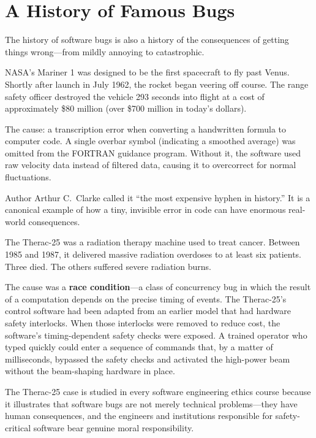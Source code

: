 \documentclass[11pt,letterpaper]{article}
\newcommand{\keyterm}[1]{\textbf{\textcolor{cssecondary}{#1}}}
\begin{document}
\section{A History of Famous Bugs}

The history of software bugs is also a history of the consequences of getting things wrong---from mildly annoying to catastrophic.

\begin{historybox}
NASA's Mariner 1 was designed to be the first spacecraft to fly past Venus. Shortly after launch in July 1962, the rocket began veering off course. The range safety officer destroyed the vehicle 293 seconds into flight at a cost of approximately \$80 million (over \$700 million in today's dollars).

The cause: a transcription error when converting a handwritten formula to computer code. A single overbar symbol (indicating a smoothed average) was omitted from the FORTRAN guidance program. Without it, the software used raw velocity data instead of filtered data, causing it to overcorrect for normal fluctuations.

Author Arthur C.\ Clarke called it ``the most expensive hyphen in history.'' It is a canonical example of how a tiny, invisible error in code can have enormous real-world consequences.
\end{historybox}

\begin{historybox}
The Therac-25 was a radiation therapy machine used to treat cancer. Between 1985 and 1987, it delivered massive radiation overdoses to at least six patients. Three died. The others suffered severe radiation burns.

The cause was a \keyterm{race condition}---a class of concurrency bug in which the result of a computation depends on the precise timing of events. The Therac-25's control software had been adapted from an earlier model that had hardware safety interlocks. When those interlocks were removed to reduce cost, the software's timing-dependent safety checks were exposed. A trained operator who typed quickly could enter a sequence of commands that, by a matter of milliseconds, bypassed the safety checks and activated the high-power beam without the beam-shaping hardware in place.

The Therac-25 case is studied in every software engineering ethics course because it illustrates that software bugs are not merely technical problems---they have human consequences, and the engineers and institutions responsible for safety-critical software bear genuine moral responsibility.
\end{historybox}
\end{document}
